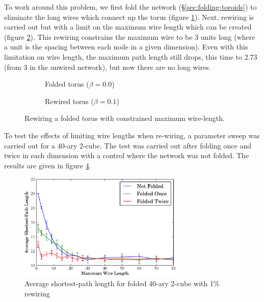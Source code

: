 			To work around this problem, we first fold the network
			(\S\ref{sec:folding-toroids}) to eliminate the long wires which connect up
			the torus (figure \ref{fig:torusNetworkFB0}). Next, rewiring is carried
			out but with a limit on the maximum wire length which can be created
			(figure \ref{fig:torusNetworkFB01}).  This rewiring constrains the maximum
			wire to be 3 units long (where a unit is the spacing between each node in
			a given dimension). Even with this limitation on wire length, the maximum
			path length still drops, this time to 2.73 (from 3 in the unwired
			network), but now there are no long wires.
			
			\begin{figure}
				\center
				\begin{subfigure}[t]{0.45\textwidth}
					\center
					
					\caption{Folded torus ($\beta=0.0$)}
					\label{fig:torusNetworkFB0}
				\end{subfigure}
				\begin{subfigure}[t]{0.45\textwidth}
					\center
					
					\caption{Rewired torus ($\beta=0.1$)}
					\label{fig:torusNetworkFB01}
				\end{subfigure}
				
				\caption{Rewiring a folded torus with constrained maximum wire-length.}
				\label{fig:torusNetworkF}
			\end{figure}
			
			To test the effects of limiting wire lengths when re-wiring, a parameter
			sweep was carried out for a 40-ary 2-cube. The test was carried out after
			folding once and twice in each dimension with a control where the network
			was not folded. The results are given in figure
			\ref{fig:smallWorldLimitedWiring}.
			
			\begin{figure}
				\center
				\includegraphics[width=0.7\textwidth]{figures/smallWorldLimitedWiring}
				\caption{Average shortest-path length for folded 40-ary 2-cube with 1\% rewiring}
				\label{fig:smallWorldLimitedWiring}
			\end{figure}
			
